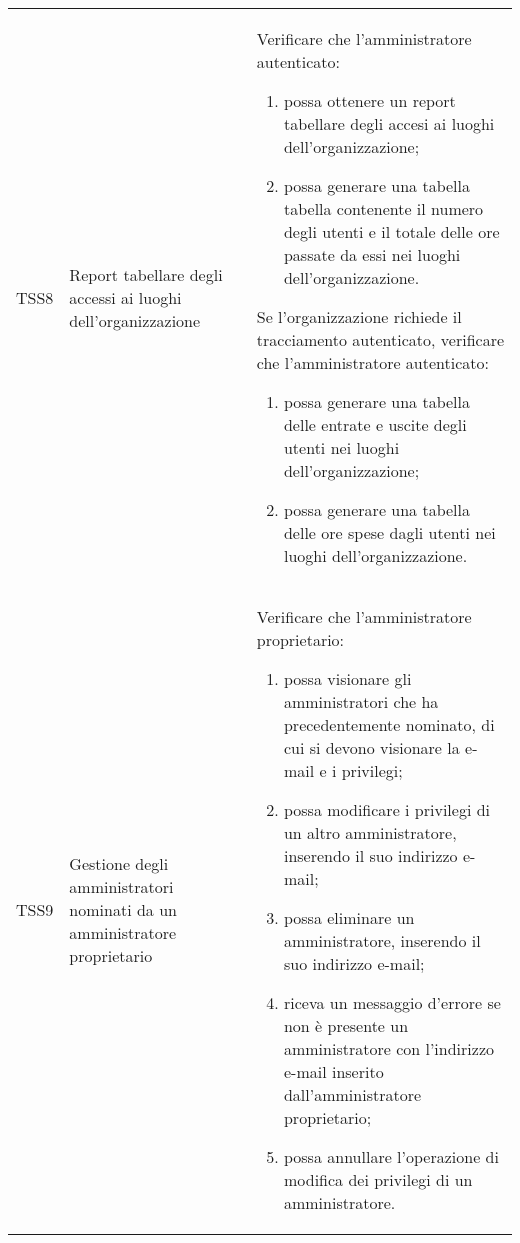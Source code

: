 {\begin{longtable}{ c | C{3cm} | C{11cm} }
TSS8 & Report tabellare degli accessi ai luoghi dell'organizzazione &
Verificare che l'amministratore autenticato:
\begin{enumerate}
    \item possa ottenere un report tabellare degli accesi ai luoghi dell'organizzazione;
    \item possa generare una tabella tabella contenente il numero degli utenti e il totale delle ore passate da essi nei luoghi dell’organizzazione.
\end{enumerate}
Se l'organizzazione richiede il tracciamento autenticato, verificare che l'amministratore autenticato:
\begin{enumerate}
    \item possa generare una tabella delle entrate e uscite degli utenti nei luoghi dell'organizzazione;
    \item possa generare una tabella delle ore spese dagli utenti nei luoghi dell'organizzazione.
\end{enumerate} \\

TSS9 & Gestione degli amministratori nominati da un amministratore proprietario & 
Verificare che l'amministratore proprietario:
\begin{enumerate}
    \item possa visionare gli amministratori che ha precedentemente nominato, di cui si devono visionare la e-mail e i privilegi;
    \item possa modificare i privilegi di un altro amministratore, inserendo il suo indirizzo e-mail;
    \item possa eliminare un amministratore, inserendo il suo indirizzo e-mail; 
    \item riceva un messaggio d'errore se non è presente un amministratore con l'indirizzo e-mail inserito dall'amministratore proprietario;
    \item possa annullare l'operazione di modifica dei privilegi di un amministratore.
\end{enumerate} \\


\end{longtable}}
